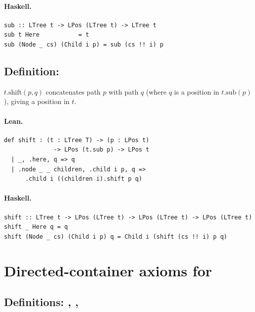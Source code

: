 \documentclass[11pt,a4paper]{article}
\begin{document}
\paragraph{Haskell.}
\begin{lstlisting}[style=haskell]
sub :: LTree t -> LPos (LTree t) -> LTree t
sub t Here           = t
sub (Node _ cs) (Child i p) = sub (cs !! i) p
\end{lstlisting}


\subsection{Definition: }

\begin{defn}
$t.\mathrm{shift}(p, q)$ concatenates path $p$ with path $q$ (where $q$ is
a position in $t.\mathrm{sub}(p)$), giving a position in $t$.
\end{defn}

\paragraph{Lean.}
\begin{lstlisting}[style=lean]
def shift : (t : LTree T) -> (p : LPos t)
              -> LPos (t.sub p) -> LPos t
  | _, .here, q => q
  | .node _ _ children, .child i p, q =>
      .child i ((children i).shift p q)
\end{lstlisting}

\paragraph{Haskell.}
\begin{lstlisting}[style=haskell]
shift :: LTree t -> LPos (LTree t) -> LPos (LTree t) -> LPos (LTree t)
shift _ Here q = q
shift (Node _ cs) (Child i p) q = Child i (shift (cs !! i) p q)
\end{lstlisting}

\section{Directed-container axioms for }

\subsection{Definitions: , , }
\end{document}
